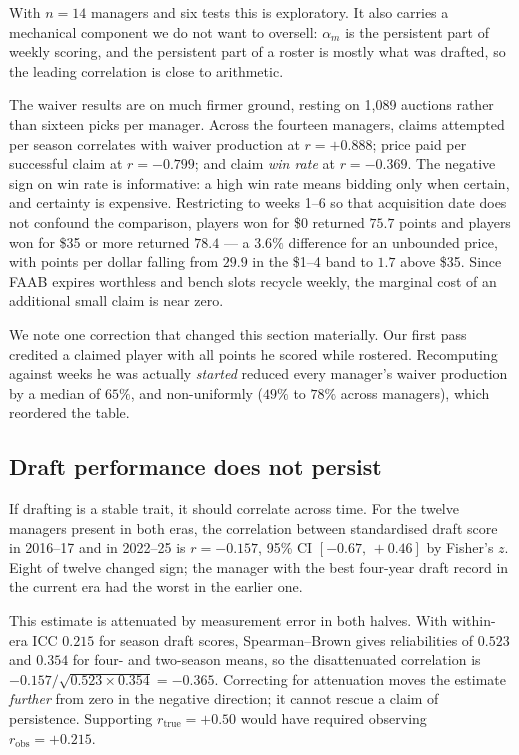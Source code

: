 \documentclass[11pt]{article}
\begin{document}
With $n=14$ managers and six tests this is exploratory. It also carries a
mechanical component we do not want to oversell: $\alpha_m$ is the persistent
part of weekly scoring, and the persistent part of a roster is mostly what was
drafted, so the leading correlation is close to arithmetic.

The waiver results are on much firmer ground, resting on 1{,}089 auctions rather
than sixteen picks per manager. Across the fourteen managers, claims attempted
per season correlates with waiver production at $r=+0.888$; price paid per
successful claim at $r=-0.799$; and claim \emph{win rate} at $r=-0.369$. The
negative sign on win rate is informative: a high win rate means bidding only when
certain, and certainty is expensive. Restricting to weeks 1--6 so that
acquisition date does not confound the comparison, players won for \$0 returned
$75.7$ points and players won for \$35 or more returned $78.4$ --- a $3.6\%$
difference for an unbounded price, with points per dollar falling from $29.9$ in
the \$1--4 band to $1.7$ above \$35. Since FAAB expires worthless and bench slots
recycle weekly, the marginal cost of an additional small claim is near zero.

We note one correction that changed this section materially. Our first pass
credited a claimed player with all points he scored while rostered.
Recomputing against weeks he was actually \emph{started} reduced every manager's
waiver production by a median of $65\%$, and non-uniformly ($49\%$ to $78\%$
across managers), which reordered the table.

\subsection{Draft performance does not persist}\label{sec:persistence}

If drafting is a stable trait, it should correlate across time. For the twelve
managers present in both eras, the correlation between standardised draft score
in 2016--17 and in 2022--25 is $r = -0.157$, 95\% CI $[-0.67,\,+0.46]$ by
Fisher's $z$. Eight of twelve changed sign; the manager with the best four-year
draft record in the current era had the worst in the earlier one.

This estimate is attenuated by measurement error in both halves. With within-era
ICC $0.215$ for season draft scores, Spearman--Brown gives reliabilities of
$0.523$ and $0.354$ for four- and two-season means, so the disattenuated
correlation is $-0.157/\sqrt{0.523 \times 0.354} = -0.365$. Correcting for
attenuation moves the estimate \emph{further} from zero in the negative
direction; it cannot rescue a claim of persistence. Supporting
$r_{\text{true}} = +0.50$ would have required observing $r_{\text{obs}} = +0.215$.
\end{document}
